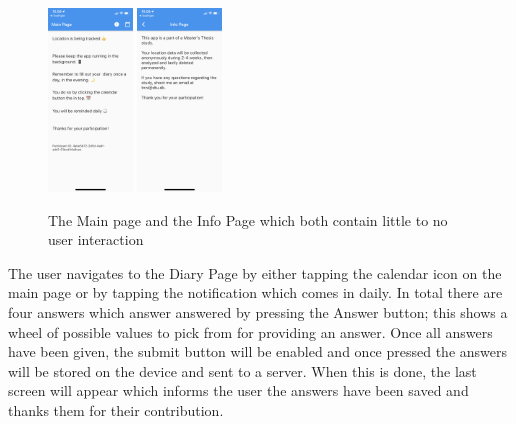 \begin{figure}
    \centering
    \includegraphics[width=0.2\textwidth]{images/app_imgs/app_mainpage.png} \includegraphics[width=0.2\textwidth]{images/app_imgs/app_infopage.png}
    \caption{The Main page and the Info Page which both contain little to no user interaction}
    \label{fig:my_label}
\end{figure}

The user navigates to the Diary Page by either tapping the calendar icon on the main page or by tapping the notification which comes in daily. In total there are four answers which answer answered by pressing the Answer button; this shows a wheel of possible values to pick from for providing an answer. Once all answers have been given, the submit button will be enabled and once pressed the answers will be stored on the device and sent to a server. When this is done, the last screen will appear which informs the user the answers have been saved and thanks them for their contribution.

